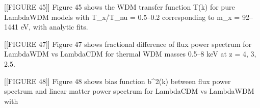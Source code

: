 \documentclass[11pt,a4paper]{article}
\begin{document}
[[FIGURE 45]] Figure 45 shows the WDM transfer function T(k) for pure LambdaWDM models with T\_x/T\_nu = 0.5--0.2 corresponding to m\_x = 92--1441 eV, with analytic fits.

[[FIGURE 47]] Figure 47 shows fractional difference of flux power spectrum for LambdaWDM vs LambdaCDM for thermal WDM masses 0.5--8 keV at z = 4, 3, 2.5.

[[FIGURE 48]] Figure 48 shows bias function b\textasciicircum{}2(k) between flux power spectrum and linear matter power spectrum for LambdaCDM vs LambdaWDM with
\end{document}
